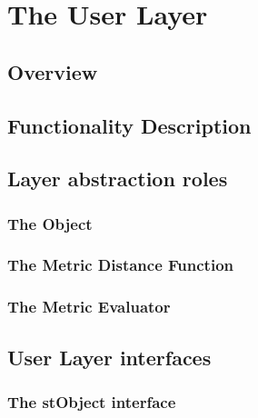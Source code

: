 \chapter{The User Layer}
\label{cha:userlayer}

\section{Overview}

\section{Functionality Description}

\section{Layer abstraction roles}

\subsection{The Object}

\subsection{The Metric Distance Function}

\subsection{The Metric Evaluator}

\section{User Layer interfaces}

\subsection{The stObject interface}

